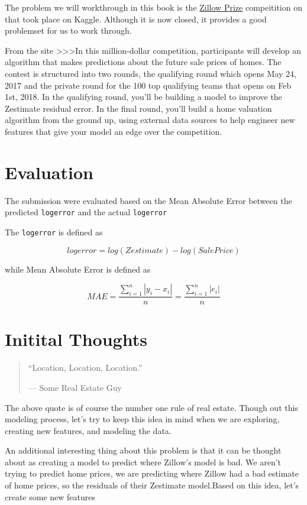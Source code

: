 \documentclass[]{book}
\theoremstyle{definition}
\theoremstyle{definition}
\theoremstyle{definition}
\theoremstyle{remark}
\begin{document}
The problem we will workthrough in this book is the
\href{https://www.kaggle.com/c/zillow-prize-1}{Zillow Prize}
compeitition on that took place on Kaggle. Although it is now closed, it
provides a good problemset for us to work through.

From the site \textgreater{}\textgreater{}\textgreater{}In this
million-dollar competition, participants will develop an algorithm that
makes predictions about the future sale prices of homes. The contest is
structured into two rounds, the qualifying round which opens May 24,
2017 and the private round for the 100 top qualifying teams that opens
on Feb 1st, 2018. In the qualifying round, you'll be building a model to
improve the Zestimate residual error. In the final round, you'll build a
home valuation algorithm from the ground up, using external data sources
to help engineer new features that give your model an edge over the
competition.

\section{Evaluation}\label{evaluation}

The submission were evaluated based on the Mean Absolute Error between
the predicted \texttt{logerror} and the actual \texttt{logerror}

The \texttt{logerror} is defined as

\[logerror = log(Zestimate) - log(SalePrice)\]

while Mean Absolute Error is defined as

\[MAE = \frac{{\sum_{i=1}^{n} |y_i - x_i|}}{n} = \frac{{\sum_{i=1}^{n} |e_i|}}{n} \]

\section{Initital Thoughts}\label{initital-thoughts}

\begin{quote}
``Location, Location, Location.''

--- Some Real Estate Guy
\end{quote}

The above quote is of course the number one rule of real estate. Though
out this modeling process, let's try to keep this idea in mind when we
are exploring, creating new features, and modeling the data.

An additional interesting thing about this problem is that it can be
thought about as creating a model to predict where Zillow's model is
bad. We aren't trying to predict home prices, we are predicting where
Zillow had a bad estimate of home prices, so the residuals of their
Zestimate model.Based on this idea, let's create some new features
\end{document}
